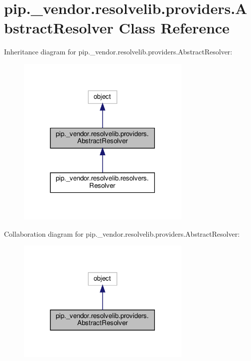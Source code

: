 \hypertarget{classpip_1_1__vendor_1_1resolvelib_1_1providers_1_1AbstractResolver}{}\section{pip.\+\_\+vendor.\+resolvelib.\+providers.\+Abstract\+Resolver Class Reference}
\label{classpip_1_1__vendor_1_1resolvelib_1_1providers_1_1AbstractResolver}


Inheritance diagram for pip.\+\_\+vendor.\+resolvelib.\+providers.\+Abstract\+Resolver\+:
\nopagebreak
\begin{figure}[H]
\begin{center}
\leavevmode
\includegraphics[width=237pt]{classpip_1_1__vendor_1_1resolvelib_1_1providers_1_1AbstractResolver__inherit__graph}
\end{center}
\end{figure}


Collaboration diagram for pip.\+\_\+vendor.\+resolvelib.\+providers.\+Abstract\+Resolver\+:
\nopagebreak
\begin{figure}[H]
\begin{center}
\leavevmode
\includegraphics[width=237pt]{classpip_1_1__vendor_1_1resolvelib_1_1providers_1_1AbstractResolver__coll__graph}
\end{center}
\end{figure}
